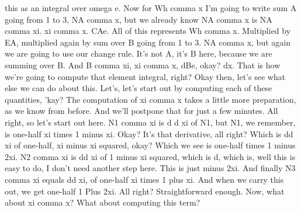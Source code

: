 \documentclass[10pt]{article}
\begin{document}
this as an integral over omega e. Now for Wh comma x I'm going to write sum A going from 1 to 3, NA comma x, but we already know NA comma x is NA comma xi. xi comma x. CAe. All of this represents Wh comma x. Multiplied by EA, multiplied again by sum over B going from 1 to 3. NA comma x, but again we are going to use our change rule. It's not A, it's B here, because we are summing over B. And B comma xi, xi comma x, dBe, okay? dx. That is how we're going to compute that element integral, right? Okay then, let's see what else we can do about this. Let's, let's start out by computing each of these quantities, 'kay? The computation of xi comma x takes a little more preparation, as we know from before. And we'll postpone that for just a few minutes. All right, so let's start out here. N1 comma xi is d d xi of N1, but N1, we remember, is one-half xi times 1 minus xi. Okay? It's that derivative, all right? Which is dd xi of one-half, xi minus xi squared, okay? Which we see is one-half times 1 minus 2xi. N2 comma xi is dd xi of 1 minus xi squared, which is d, which is, well this is easy to do, I don't need another step here. This is just minus 2xi. And finally N3 comma xi equals dd xi, of one-half xi times 1 plus xi. And when we carry this out, we get one-half 1 Plus 2xi. All right? Straightforward enough. Now, what about xi comma x? What about computing this term?
\end{document}
